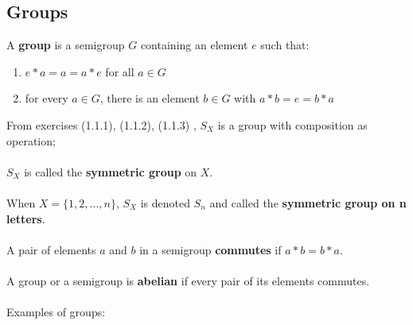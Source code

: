 \documentclass{article}
\begin{document}
\subsection{Groups}
A \textbf{group} is a semigroup \(G\) containing an element \(e\) such that:
\begin{enumerate}
    \item \(e*a=a=a*e\) for all \(a\in G\)
    \item for every \(a\in G\), there is an element \(b\in G\) with \(a*b=e=b*a\)
\end{enumerate}
From exercises \color{gray}(1.1.1), (1.1.2), (1.1.3) \color{black}, \(S_X\) is a group with composition as operation;\\\\
\(S_X\) is called the \textbf{symmetric group} on \(X\).\\\\
When \(X=\{1,2,...,n\}\), \(S_X\) is denoted \(S_n\) and called the \textbf{symmetric group on n letters}.\\\\
A pair of elements \(a\) and \(b\) in a semigroup \textbf{commutes} if \(a*b=b*a\).\\\\
A group or a semigroup is \textbf{abelian} if every pair of its elements commutes.\\\\
Examples of groups:
\end{document}
